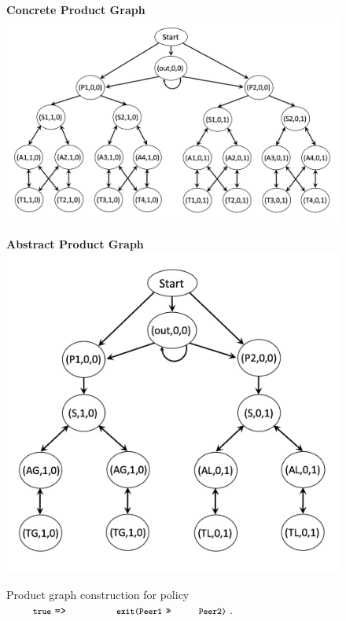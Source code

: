 \documentclass[numbers, 10pt, preprint]{sigplanconf}
\newcommand{\CD}[1]{\texttt{\small #1}}  %
\newcommand{\KW}[1]{\texttt{\small\bfseries{#1}}}
\newcommand{\True}{\CD{true}}
\newcommand{\Prefer}{\texttt{>>}}
\newcommand{\Path}{\texttt{=>}}
\newcommand{\Exit}{\KW{exit}}
\newcommand{\hdr}[2]{\flushleft \chdr{\hspace{5mm}#1}{#2}}
\newcommand{\chdr}[2]{\textbf{#1} {#2} \\ \centering}%
\begin{document}
\begin{figure}[t!]
  \vspace{1em}
  \begin{minipage}[t]{.6\linewidth}
    \hdr{Concrete Product Graph}{}
    \includegraphics[width=.9\columnwidth]{figures/pg-con}
  \end{minipage}%
  \begin{minipage}[t]{.4\linewidth}
  \hdr{Abstract Product Graph}{}
    \includegraphics[width=.88\columnwidth]{figures/pg-abs}

  \end{minipage}%

  \hrulefill
  \vspace*{.4em}%

  \caption{Product graph construction for policy $\True ~\Path~ \CD{\Exit(\text{Peer1}} ~\Prefer~ \CD{\text{Peer2})}$.}
  \label{fig:example-compilation}
\end{figure}
\end{document}
